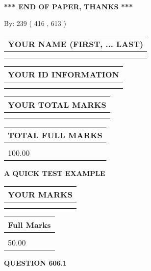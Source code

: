 \documentclass[12pt]{article}
\begin{document}
\vspace{1.0in} 
{\textbf{\large{ *** END OF PAPER, THANKS *** }}} 
   
   
\hspace{1.0in} By: 
 239 ( 416 ,  613 )
   
   
   
   
\newpage 
\setcounter{page}{ 
   606001 } 
   
   
   
   
\noindent\begin{tabular}{|l|}
\hline
YOUR NAME (FIRST, ... LAST)  \\
\hline
 \\ 
 \\ 
\hline
\end{tabular}
\hspace{0.05in} \begin{tabular}{|l|}
\hline
 YOUR   ID   INFORMATION  \\
\hline
 \\ 
 \\ 
\hline
\end{tabular}
   
   
\vspace{0.2in}\noindent\begin{tabular}{|l|}
\hline
YOUR TOTAL MARKS  \\
\hline
 \\ 
 \\ 
\hline
\end{tabular}
\hspace{0.05in} \begin{tabular}{|l|}
\hline
TOTAL FULL MARKS  \\
\hline
 \\ 
100.00 \\
\hline
\end{tabular}
   
   
 \vspace{0.2in}
{\LARGE {\textbf{ A QUICK TEST EXAMPLE}}}
   
   
  
\vspace{0.2in}
  
\noindent\begin{tabular}{|l|}
\hline
 YOUR MARKS  \\
\hline
 \\ 
 \\ 
\hline
\end{tabular}
\hspace{0.05in} \begin{tabular}{|l|}
\hline
 Full Marks  \\
\hline
 \\ 
50.00 \\
\hline
\end{tabular}
{\textbf{\Large{QUESTION
606.1 
}}}
  
\end{document}
